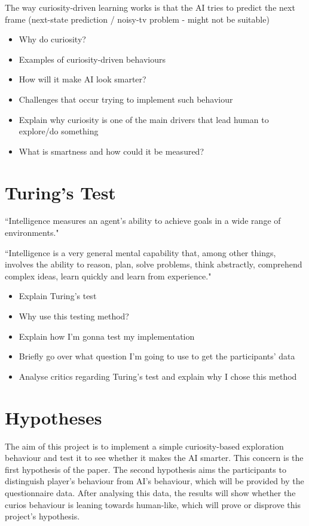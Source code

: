 \documentclass[journal]{IEEEtran}
\begin{document}
The way curiosity-driven learning works is that the AI tries to predict the next frame (next-state prediction / noisy-tv problem - might not be suitable)
\begin{itemize}
	\item Why do curiosity?
	\item Examples of curiosity-driven behaviours
	\item How will it make AI look smarter?
	\item Challenges that occur trying to implement such behaviour
	\item Explain why curiosity is one of the main drivers that lead human to explore/do something
	\item What is smartness and how could it be measured?
\end{itemize}

\section{Turing's Test}
``Intelligence measures an agent’s ability to achieve goals in a wide range of
environments." \cite{legg2007universal}

``Intelligence is a very general mental capability that, among other things, involves
the ability to reason, plan, solve problems, think abstractly, comprehend complex
ideas, learn quickly and learn from experience." \cite{gottfredson1997mainstream}
\begin{itemize}
	\item Explain Turing's test
	\item Why use this testing method?
	\item Explain how I'm gonna test my implementation
	\item Briefly go over what question I'm going to use to get the participants' data
	\item Analyse critics regarding Turing's test and explain why I chose this method
\end{itemize}

\section{Hypotheses}
The aim of this project is to implement a simple curiosity-based exploration behaviour and test it to see whether it makes the AI smarter. This concern is the first hypothesis of the paper. The second hypothesis aims the participants to distinguish player's behaviour from AI's behaviour, which will be provided by the questionnaire data. After analysing this data, the results will show whether the curios behaviour is leaning towards human-like, which will prove or disprove this project's hypothesis.
\end{document}
